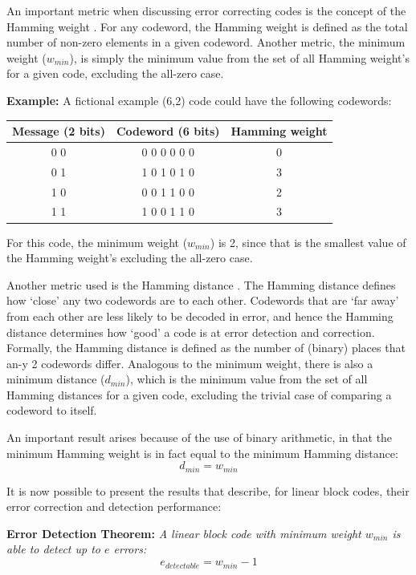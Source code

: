 \documentclass[11pt]{article}
\numberwithin{equation}{subsection}
\begin{document}
An important metric when discussing error correcting codes is the concept of the Hamming weight \cite{coon15}. 
For any codeword, the Hamming weight is defined as the total number of non-zero elements in a given codeword. 
Another metric, the minimum weight ($w_{min}$), is simply the minimum value from the set of all Hamming weight's for a given code, excluding the all-zero case.

\textbf{Example:}
A fictional example (6,2) code could have the following codewords:

\begin{center}
\begin{tabular}{ c | c | c }
Message (2 bits) & Codeword (6 bits) & Hamming weight \\
\hline
0 0 & 0 0 0 0 0 0 & 0 \\
0 1 & 1 0 1 0 1 0 & 3 \\
1 0 & 0 0 1 1 0 0 & 2 \\
1 1 & 1 0 0 1 1 0 & 3 \\
\end{tabular}
\end{center}
For this code, the minimum weight ($w_{min}$) is 2, since that is the smallest value of the Hamming weight's excluding the all-zero case.

Another metric used is the Hamming distance \cite{coon15}. The Hamming distance defines how `close' any two codewords are to each other. Codewords that are `far away' from each other are less likely to be decoded in error, and hence the Hamming distance determines how `good' a code is at error detection and correction. Formally, the Hamming distance is defined as the number of (binary) places that an-y 2 codewords differ. Analogous to the minimum weight, there is also a minimum distance ($d_{min}$), which is the minimum value from the set of all Hamming distances for a given code, excluding the trivial case of comparing a codeword to itself.

An important result arises because of the use of binary arithmetic, in that the minimum Hamming weight is in fact equal to the minimum Hamming distance:
\begin{equation}
d_{min} = w_{min}
\end{equation}

It is now possible to present the results that describe, for linear block codes, their error correction and detection performance:

\medskip
\noindent
\textbf{Error Detection Theorem:}
\textit{A linear block code with minimum weight $w_{min}$ is able to detect up to $e$ errors:}
\begin{equation}
e_{detectable} = w_{min} - 1
\end{equation}
\end{document}
